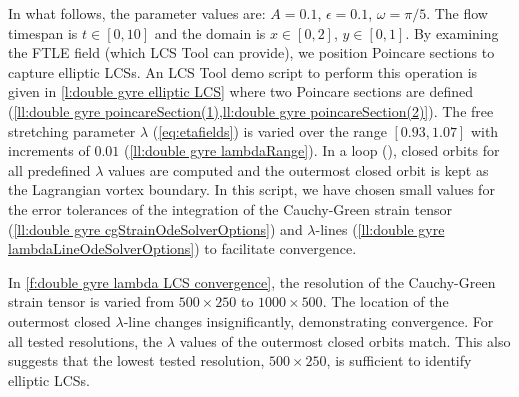 \documentclass[5p]{elsarticle}
\begin{document}
In what follows, the parameter values are: $A = 0.1$, $\epsilon = 0.1$, $\omega = \pi/5$. The flow timespan is $t \in [0,10]$ and the domain is $x \in [0,2]$, $y \in [0,1]$. By examining the FTLE field (which LCS Tool can provide), we position Poincare sections to capture elliptic LCSs. An LCS Tool demo script to perform this operation is given in \cref{l:double gyre elliptic LCS} where two Poincare sections are defined (\cref{ll:double gyre poincareSection(1),ll:double gyre poincareSection(2)}). The free stretching parameter $\lambda$ (\cref{eq:etafields}) is varied over the range $[0.93,1.07]$ with increments of $0.01$ (\cref{ll:double gyre lambdaRange}).
In a loop (), closed orbits for all predefined $\lambda$ values are computed and the outermost closed orbit is kept as the Lagrangian vortex boundary.
In this script, we have chosen small values for the error tolerances of the integration of the Cauchy-Green strain tensor (\cref{ll:double gyre cgStrainOdeSolverOptions}) and $\lambda$-lines (\cref{ll:double gyre lambdaLineOdeSolverOptions}) to facilitate convergence.



In \cref{f:double gyre lambda LCS convergence}, the resolution of the  Cauchy-Green strain tensor is varied from $500 \times 250$ to $1000 \times 500$. The location of the outermost closed $\lambda$-line changes insignificantly, demonstrating convergence. For all tested resolutions, the $\lambda$ values of the outermost closed orbits match.
This also suggests that the lowest tested resolution, $500 \times 250$, is sufficient to identify elliptic LCSs.
\end{document}

